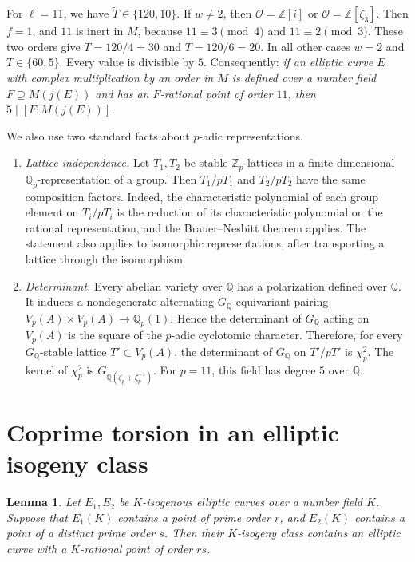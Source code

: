 \documentclass[11pt]{article}
\newtheorem{lemma}{Lemma}
\theoremstyle{remark}
\newcommand{\Q}{\mathbb Q}
\newcommand{\Z}{\mathbb Z}
\begin{document}
\begin{enumerate}
For \(\ell=11\), we have \(\widetilde T\in\{120,10\}\). If
\(w\neq2\), then \(\mathcal O=\Z[i]\) or \(\mathcal O=\Z[\zeta_3]\).
Then \(f=1\), and \(11\) is inert in \(M\), because
\(11\equiv3\pmod4\) and \(11\equiv2\pmod3\). These two orders give
\(T=120/4=30\) and \(T=120/6=20\). In all other cases \(w=2\) and
\(T\in\{60,5\}\). Every value is divisible by \(5\). Consequently:
\emph{if an elliptic curve \(E\) with complex multiplication by an
order in \(M\) is defined over a number field \(F\supseteq M(j(E))\)
and has an \(F\)-rational point of order \(11\), then
\(5\mid[F:M(j(E))]\).}
\end{enumerate}

We also use two standard facts about \(p\)-adic representations.
\begin{enumerate}
\item[(e)] \emph{Lattice independence.} Let \(T_1,T_2\) be stable
\(\Z_p\)-lattices in a finite-dimensional \(\Q_p\)-representation of
a group. Then \(T_1/pT_1\) and \(T_2/pT_2\) have the same composition
factors. Indeed, the characteristic polynomial of each group element
on \(T_i/pT_i\) is the reduction of its characteristic polynomial on
the rational representation, and the Brauer--Nesbitt theorem applies.
The statement also applies to isomorphic representations, after
transporting a lattice through the isomorphism.

\item[(f)] \emph{Determinant.} Every abelian variety over \(\Q\) has a
polarization defined over \(\Q\). It induces a nondegenerate
alternating \(G_{\Q}\)-equivariant pairing
\(V_p(A)\times V_p(A)\to\Q_p(1)\). Hence the determinant of
\(G_{\Q}\) acting on \(V_p(A)\) is the square of the \(p\)-adic
cyclotomic character. Therefore, for every \(G_{\Q}\)-stable lattice
\(T'\subset V_p(A)\), the determinant of \(G_{\Q}\) on \(T'/pT'\) is
\(\chi_p^2\). The kernel of \(\chi_p^2\) is
\(G_{\Q(\zeta_p+\zeta_p^{-1})}\). For \(p=11\), this field has degree
\(5\) over \(\Q\).
\end{enumerate}

\section{Coprime torsion in an elliptic isogeny class}\label{sec:coprime}

\begin{lemma}\label{lem:coprime}
Let \(E_1,E_2\) be \(K\)-isogenous elliptic curves over a number field
\(K\). Suppose that \(E_1(K)\) contains a point of prime order \(r\),
and \(E_2(K)\) contains a point of a distinct prime order \(s\). Then
their \(K\)-isogeny class contains an elliptic curve with a
\(K\)-rational point of order \(rs\).
\end{lemma}
\end{document}
